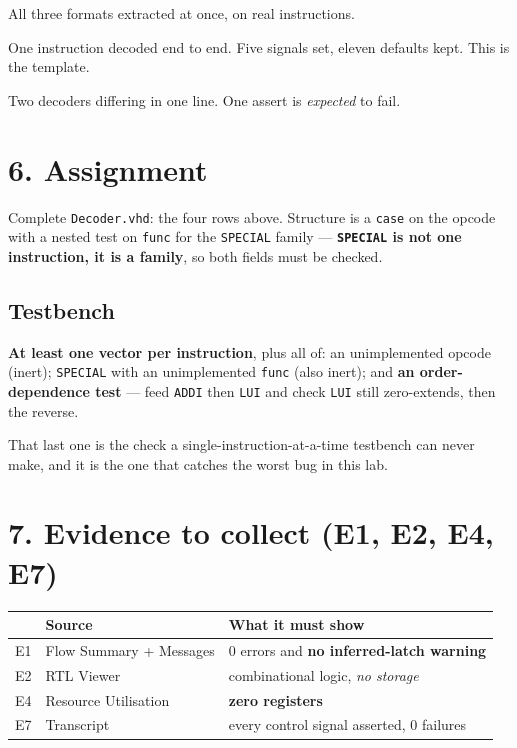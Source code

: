 \documentclass[11pt]{article}
\newcommand{\code}[1]{\texttt{#1}}
\begin{document}
\begin{description}[leftmargin=2.4em,style=nextline,itemsep=2pt]
\item[Example 1 --- \code{fields}] All three formats extracted at once, on real
instructions.
\item[Example 2 --- \code{decode\_add}] One instruction decoded end to end. Five
signals set, eleven defaults kept. This is the template.
\item[Example 3 --- \code{latch\_storm}] Two decoders differing in one line. One
assert is \emph{expected} to fail.
\end{description}

\section*{6. Assignment}

Complete \code{Decoder.vhd}: the four rows above. Structure is a \code{case} on
the opcode with a nested test on \code{func} for the \code{SPECIAL} family ---
\textbf{\code{SPECIAL} is not one instruction, it is a family}, so both fields
must be checked.

\subsection*{Testbench}

\textbf{At least one vector per instruction}, plus all of: an unimplemented
opcode (inert); \code{SPECIAL} with an unimplemented \code{func} (also inert);
and \textbf{an order-dependence test} --- feed \code{ADDI} then \code{LUI} and
check \code{LUI} still zero-extends, then the reverse.

That last one is the check a single-instruction-at-a-time testbench can never
make, and it is the one that catches the worst bug in this lab.

\section*{7. Evidence to collect (E1, E2, E4, E7)}

\begin{center}
\begin{tabular}{lll}
\toprule
& Source & What it must show \\
\midrule
E1 & Flow Summary + Messages & 0 errors and \textbf{no inferred-latch warning} \\
E2 & RTL Viewer & combinational logic, \emph{no storage} \\
E4 & Resource Utilisation & \textbf{zero registers} \\
E7 & Transcript & every control signal asserted, 0 failures \\
\bottomrule
\end{tabular}
\end{center}
\end{document}
